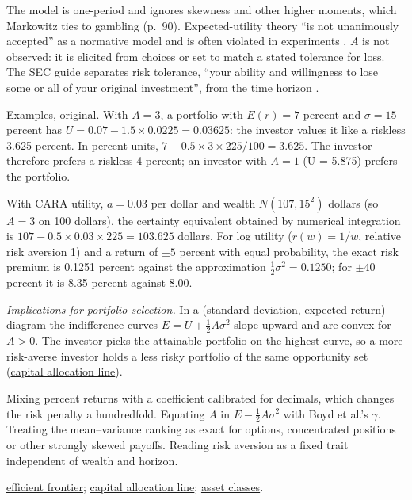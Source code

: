 \begin{qfdefinition}
The model is one-period and ignores skewness and other higher moments, which Markowitz ties to gambling (p.~90). Expected-utility theory ``is not unanimously accepted'' as a normative model and is often violated in experiments \citep[p.~3]{risk-choice-review-2013}. $A$ is not observed: it is elicited from choices or set to match a stated tolerance for loss. The SEC guide separates risk tolerance, ``your ability and willingness to lose some or all of your original investment'', from the time horizon \citep[p.~1]{asset-allocation-investor-guide}.

 Examples, original. With $A=3$, a portfolio with $E(r)=7$ percent and $\sigma=15$ percent has $U=0.07-1.5\times0.0225=0.03625$: the investor values it like a riskless 3.625 percent. In percent units, $7-0.5\times3\times225/100=3.625$. The investor therefore prefers a riskless 4 percent; an investor with $A=1$ (U = 5.875) prefers the portfolio.

With CARA utility, $a=0.03$ per dollar and wealth $N(107,15^2)$ dollars (so $A=3$ on 100 dollars), the certainty equivalent obtained by numerical integration is $107-0.5\times0.03\times225=103.625$ dollars. For log utility ($r(w)=1/w$, relative risk aversion 1) and a return of $\pm5$ percent with equal probability, the exact risk premium is 0.1251 percent against the approximation $\tfrac12\sigma^2=0.1250$; for $\pm40$ percent it is 8.35 percent against 8.00.

\emph{Implications for portfolio selection.} In a (standard deviation, expected return) diagram the indifference curves $E=U+\tfrac12A\sigma^2$ slope upward and are convex for $A>0$. The investor picks the attainable portfolio on the highest curve, so a more risk-averse investor holds a less risky portfolio of the same opportunity set (\hyperref[meth:capital-allocation-line]{capital allocation line}).

 Mixing percent returns with a coefficient calibrated for decimals, which changes the risk penalty a hundredfold. Equating $A$ in $E-\tfrac12A\sigma^2$ with Boyd et al.'s $\gamma$. Treating the mean--variance ranking as exact for options, concentrated positions or other strongly skewed payoffs. Reading risk aversion as a fixed trait independent of wealth and horizon.

 \hyperref[meth:efficient-frontier]{efficient frontier}; \hyperref[meth:capital-allocation-line]{capital allocation line}; \hyperref[def:asset-class-characteristics]{asset classes}.

\end{qfdefinition}

